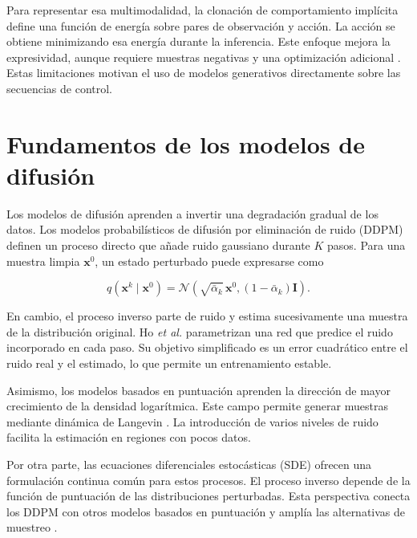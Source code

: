 Para representar esa multimodalidad, la clonaci\'on de comportamiento impl\'icita
define una funci\'on de energ\'ia sobre pares de observaci\'on y acci\'on. La acci\'on se
obtiene minimizando esa energ\'ia durante la inferencia. Este enfoque mejora la
expresividad, aunque requiere muestras negativas y una optimizaci\'on adicional
\cite{florence2021ibc}. Estas limitaciones motivan el uso de modelos generativos
directamente sobre las secuencias de control.

\section{Fundamentos de los modelos de difusi\'on}
\label{sec:fundamentos-difusion}

Los modelos de difusi\'on aprenden a invertir una degradaci\'on gradual de los datos.
Los modelos probabil\'isticos de difusi\'on por eliminaci\'on de ruido (DDPM) definen
un proceso directo que a\~nade ruido gaussiano durante $K$ pasos. Para una muestra
limpia $\mathbf{x}^{0}$, un estado perturbado puede expresarse como
\cite{ho2020ddpm}

\begin{equation}
  q(\mathbf{x}^{k}\mid\mathbf{x}^{0}) =
  \mathcal{N}\!\left(\sqrt{\bar{\alpha}_{k}}\,\mathbf{x}^{0},
  (1-\bar{\alpha}_{k})\mathbf{I}\right).
  \label{eq:proceso-directo}
\end{equation}

En cambio, el proceso inverso parte de ruido y estima sucesivamente una muestra de
la distribuci\'on original. Ho \textit{et al.} \cite{ho2020ddpm} parametrizan una red
que predice el ruido incorporado en cada paso. Su objetivo simplificado es un error
cuadr\'atico entre el ruido real y el estimado, lo que permite un entrenamiento
estable.

Asimismo, los modelos basados en puntuaci\'on aprenden la direcci\'on de mayor
crecimiento de la densidad logar\'itmica. Este campo permite generar muestras
mediante din\'amica de Langevin
\cite{song2019ncsn}. La introducci\'on de varios niveles de ruido facilita la
estimaci\'on en regiones con pocos datos.

Por otra parte, las ecuaciones diferenciales estoc\'asticas (SDE) ofrecen una
formulaci\'on continua com\'un para estos procesos. El proceso inverso depende de la
funci\'on de puntuaci\'on de las distribuciones perturbadas. Esta perspectiva conecta
los DDPM con otros modelos basados en puntuaci\'on y ampl\'ia las alternativas de
muestreo \cite{song2021sde}.

